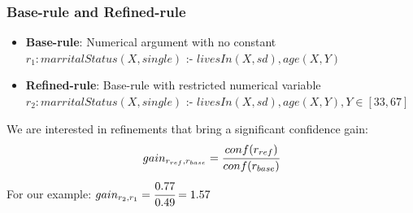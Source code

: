 \documentclass{beamer}
\begin{document}
\begin{frame}
\frametitle{Base-rule and Refined-rule}
  \begin{itemize}
   \item \textbf{Base-rule}: Numerical argument with no constant \\
      $r_1: marritalStatus(X,single)$ :- $livesIn(X,sd),age(X,Y)$ \\ 
      \quad \quad [conf=0.49,supp=2368]
   \item \textbf{Refined-rule}: Base-rule with restricted numerical variable \\  
      $r_2: marritalStatus(X,single)$ :- $livesIn(X,sd),age(X,Y),Y\in[33,67]$ \\ 
      \quad \quad [conf=0.77,supp=1092]
  \end{itemize}
 We are interested in refinements that bring a significant confidence gain:
 \begin{equation}
  gain_{r_{ref},r_{base}}=\cfrac{conf(r_{ref})}{conf(r_{base})}
 \end{equation}
 For our example:
 \begin{math}
  gain_{r_{2},r_{1}}=\cfrac{0.77}{0.49}=1.57
 \end{math}
\end{frame}
\end{document}
